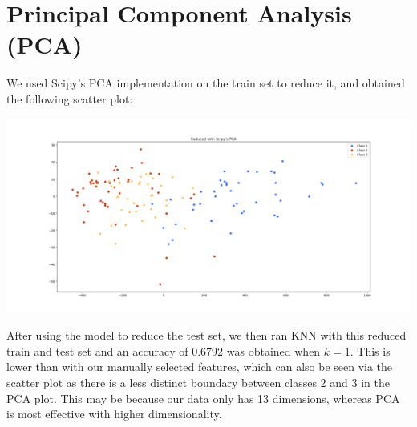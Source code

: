 \documentclass[11pt]{article}
\begin{document}
\section{Principal Component Analysis (PCA)}
We used Scipy's PCA implementation on the train set to reduce it, and obtained the following scatter plot:
\begin{center}
\includegraphics[scale=0.2]{pca_scatter_graph}
\end{center}

After using the model to reduce the test set, we then ran KNN with this reduced train and test set and an accuracy of 0.6792 was obtained when $k = 1$. This is lower than with our manually selected features, which can also be seen via the scatter plot as there is a less distinct boundary between classes 2 and 3 in the PCA plot. This may be because our data only has 13 dimensions, whereas PCA is most effective with higher dimensionality.
\end{document}

